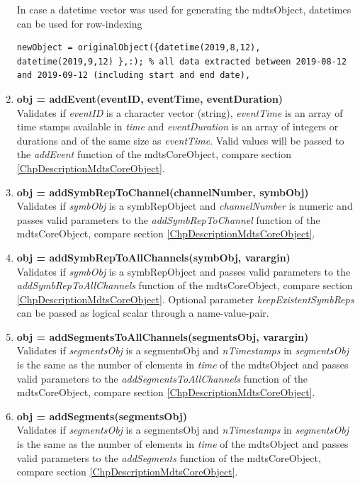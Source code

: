\documentclass[a4]{scrreprt}
\begin{document}
\begin{enumerate}
In case a datetime vector was used for generating the mdtsObject, datetimes  can be used for row-indexing

\begin{lstlisting}[frame=single]
newObject = originalObject({datetime(2019,8,12), datetime(2019,9,12) },:); % all data extracted between 2019-08-12 and 2019-09-12 (including start and end date),
\end{lstlisting}

\item \textbf{obj = addEvent(eventID, eventTime, eventDuration)}\\
Validates if \textit{eventID} is a character vector (string), \textit{eventTime} is an array of time stamps available in \textit{time} and \textit{eventDuration} is an array of integers or durations and of the same size as \textit{eventTime}. Valid values will be passed to the \textit{addEvent} function of the mdtsCoreObject, compare section \ref{ChpDescriptionMdtsCoreObject}.

\item \textbf{obj = addSymbRepToChannel(channelNumber, symbObj)}\\
Validates if \textit{symbObj} is a symbRepObject and \textit{channelNumber} is numeric and passes valid parameters to the \textit{addSymbRepToChannel} function of the mdtsCoreObject, compare section \ref{ChpDescriptionMdtsCoreObject}.

\item \textbf{obj = addSymbRepToAllChannels(symbObj, varargin)}\\
Validates if \textit{symbObj} is a symbRepObject and passes valid parameters to the \textit{addSymbRepToAllChannels} function of the mdtsCoreObject, compare section \ref{ChpDescriptionMdtsCoreObject}. Optional parameter \textit{keepExistentSymbReps} can be passed as logical scalar through a name-value-pair.

\item \textbf{obj = addSegmentsToAllChannels(segmentsObj, varargin)}\\
Validates if \textit{segmentsObj} is a segmentsObj and \textit{nTimestamps} in \textit{segmentsObj} is the same as the number of elements in \textit{time} of the mdtsObject and passes valid parameters to the \textit{addSegmentsToAllChannels} function of the mdtsCoreObject, compare section \ref{ChpDescriptionMdtsCoreObject}.

\item \textbf{obj = addSegments(segmentsObj)}\\
Validates if \textit{segmentsObj} is a segmentsObj and \textit{nTimestamps} in \textit{segmentsObj} is the same as the number of elements in \textit{time} of the mdtsObject and passes valid parameters to the \textit{addSegments} function of the mdtsCoreObject, compare section \ref{ChpDescriptionMdtsCoreObject}.


\end{enumerate}
\end{document}
